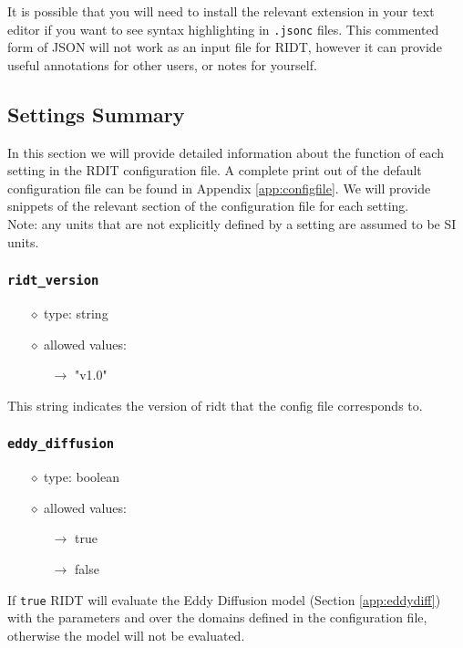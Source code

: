 \documentclass[]{article}
\def\code#1{\texttt{#1}}
\begin{document}
\noindent It is possible that you will need to install the relevant extension in
your text editor if you want to see syntax highlighting in \code{.jsonc} files.
This commented form of JSON will not work as an input file for RIDT,
however it can provide useful annotations for other users, or notes for
yourself. 


\subsection{Settings Summary}
In this section we will provide detailed information about the function of each
setting in the RDIT configuration file. A complete print out of the default
configuration file can be found in Appendix \ref{app:configfile}. We will
provide snippets of the relevant section of the configuration file for each
setting.\\

\noindent Note: any units that are not explicitly defined by a setting are
assumed to be SI units.

\subsubsection{\code{ridt\_version}}
\begin{itemize}
    \item[$\diamond$] type: string 
    \item[$\diamond$] allowed values:
    \begin{itemize}
        \item[$\rightarrow$] "v1.0"
    \end{itemize}
\end{itemize}
This string indicates the version of ridt that the config file corresponds to.

\subsubsection{\code{eddy\_diffusion}}
\begin{itemize}
    \item[$\diamond$] type: boolean
    \item[$\diamond$] allowed values:
    \begin{itemize}
        \item[$\rightarrow$] true
        \item[$\rightarrow$] false
    \end{itemize}
\end{itemize}
If \code{true} RIDT will evaluate the Eddy Diffusion model (Section
\ref{app:eddydiff}) with the parameters and over the domains defined in
the configuration file, otherwise the model will not be evaluated.
\end{document}
